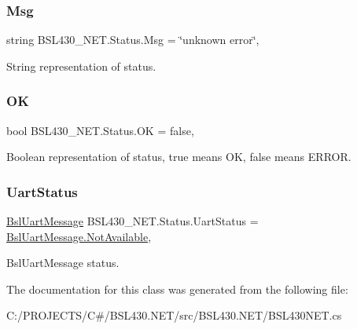 \subsubsection{\texorpdfstring{Msg}{Msg}}
{\footnotesize\ttfamily string B\+S\+L430\+\_\+\+N\+E\+T.\+Status.\+Msg = \char`\"{}unknown error\char`\"{}\hspace{0.3cm}{\ttfamily [get]}, {\ttfamily [set]}}



String representation of status. 

\mbox{\label{class_b_s_l430___n_e_t_1_1_status_a02e494acbd7dbbbdc4b2c83ebc6006d2}} 
\subsubsection{\texorpdfstring{OK}{OK}}
{\footnotesize\ttfamily bool B\+S\+L430\+\_\+\+N\+E\+T.\+Status.\+OK = false\hspace{0.3cm}{\ttfamily [get]}, {\ttfamily [set]}}



Boolean representation of status, true means OK, false means E\+R\+R\+OR. 

\mbox{\label{class_b_s_l430___n_e_t_1_1_status_ad868a4102f279c1e07d732fd2d4cda74}} 
\subsubsection{\texorpdfstring{UartStatus}{UartStatus}}
{\footnotesize\ttfamily \mbox{\hyperlink{namespace_b_s_l430___n_e_t_ae93ff76b832d2a9a0c3d67665e2f25ac}{Bsl\+Uart\+Message}} B\+S\+L430\+\_\+\+N\+E\+T.\+Status.\+Uart\+Status = \mbox{\hyperlink{namespace_b_s_l430___n_e_t_ae93ff76b832d2a9a0c3d67665e2f25aca534ceac854da4ba59c4dc41b7ab732dc}{Bsl\+Uart\+Message.\+Not\+Available}}\hspace{0.3cm}{\ttfamily [get]}, {\ttfamily [set]}}



Bsl\+Uart\+Message status. 



The documentation for this class was generated from the following file\+:\begin{DoxyCompactItemize}
\item 
C\+:/\+P\+R\+O\+J\+E\+C\+T\+S/\+C\#/\+B\+S\+L430.\+N\+E\+T/src/\+B\+S\+L430.\+N\+E\+T/B\+S\+L430\+N\+E\+T.\+cs\end{DoxyCompactItemize}
